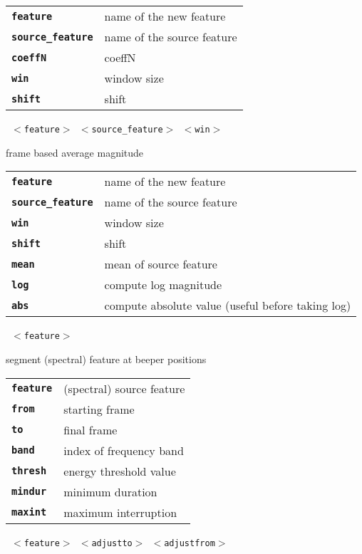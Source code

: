 \begin{description}
\begin{description}
      \begin{tabular}{ll}
 \texttt{\textbf{feature}} &         name of the new feature \\
 \texttt{\textbf{source\_feature}} &  name of the source feature \\
 \texttt{\textbf{coeffN}} &          coeffN  \\
 \texttt{\textbf{win}} &             window size  \\
 \texttt{\textbf{shift}} &            shift  \\
      \end{tabular}
       \texttt{ $<$feature$>$ $<$source\_feature$>$ $<$win$>$    } \

        frame based average magnitude

      \begin{tabular}{ll}
 \texttt{\textbf{feature}} &         name of the new feature \\
 \texttt{\textbf{source\_feature}} &  name of the source feature \\
 \texttt{\textbf{win}} &             window size  \\
 \texttt{\textbf{shift}} &            shift  \\
 \texttt{\textbf{mean}} &             mean of source feature  \\
 \texttt{\textbf{log}} &              compute log magnitude  \\
 \texttt{\textbf{abs}} &              compute absolute value (useful before taking log)  \\
      \end{tabular}
       \texttt{ $<$feature$>$      } \

        segment (spectral) feature at beeper positions

      \begin{tabular}{ll}
 \texttt{\textbf{feature}} &  (spectral) source feature \\
 \texttt{\textbf{from}} &      starting frame  \\
 \texttt{\textbf{to}} &        final frame  \\
 \texttt{\textbf{band}} &      index of frequency band  \\
 \texttt{\textbf{thresh}} &    energy threshold value  \\
 \texttt{\textbf{mindur}} &    minimum duration  \\
 \texttt{\textbf{maxint}} &    maximum interruption  \\
      \end{tabular}
       \texttt{ $<$feature$>$ $<$adjustto$>$ $<$adjustfrom$>$} \


\end{description}
\end{description}
